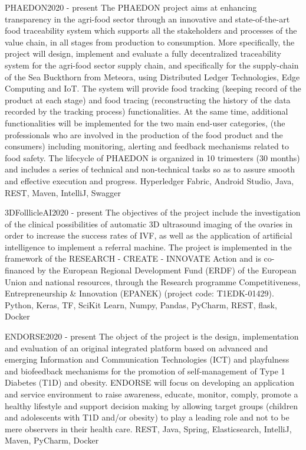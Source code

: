 
\begin{projects}
	\project
	{PHAEDON}{2020 - present}
	{}
	{The PHAEDON project aims at enhancing transparency in the agri-food sector through an innovative and state-of-the-art food traceability system which supports all the stakeholders and processes of the value chain, in all stages from production to consumption. More specifically, the project will design, implement and evaluate a fully decentralized traceability system for the agri-food sector supply chain, and specifically for the supply-chain of the Sea Buckthorn from Meteora, using Distributed Ledger Technologies, Edge Computing and IoT. The system will provide food tracking (keeping record of the product at each stage) and food tracing (reconstructing the history of the data recorded by the tracking process) functionalities. At the same time, additional functionalities will be implemented for the two main end-user categories, (the professionals who are involved in the production of the food product and the consumers) including monitoring, alerting and feedback mechanisms related to food safety. The lifecycle of PHAEDON is organized in 10 trimesters (30 months) and includes a series of technical and non-technical tasks so as to assure smooth and effective execution and progress.}
	{Hyperledger Fabric, Android Studio, Java, REST, Maven, IntelliJ, Swagger}

	\project
	{3DFolllicleAI}{2020 - present}
	{}
	{The objectives of the project include the investigation of the clinical possibilities of automatic 3D ultrasound imaging of the ovaries in order to increase the success rates of IVF, as well as the application of artificial intelligence to implement a referral machine. The project is implemented in the framework of the RESEARCH - CREATE - INNOVATE Action and is co-financed by the European Regional Development Fund (ERDF) of the European Union and national resources, through the Research programme Competitiveness, Entrepreneurship \& Innovation (EPANEK) (project code: T1EDK-01429).}
	{Python, Keras, TF, SciKit Learn, Numpy, Pandas, PyCharm, REST, flask, Docker}

	\project
	{ENDORSE}{2020 - present}
	{}
	{The object of the project is the design, implementation and evaluation of an original integrated platform based on advanced and emerging Information and Communication Technologies (ICT) and playfulness and biofeedback mechanisms for the promotion of self-management of Type 1 Diabetes (T1D) and obesity. ENDORSE will focus on developing an application and service environment to raise awareness, educate, monitor, comply, promote a healthy lifestyle and support decision making by allowing target groups (children and adolescents with T1D and/or obesity) to play a leading role and not to be mere observers in their health care.}
	{REST, Java, Spring, Elasticsearch, IntelliJ, Maven, PyCharm, Docker}


\end{projects}

